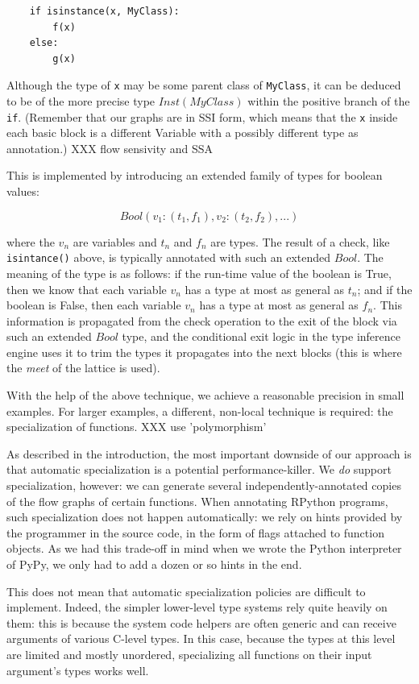 \documentclass{acm_proc_article-sp}
\begin{document}
\begin{verbatim}
    if isinstance(x, MyClass):
        f(x)
    else:
        g(x)
\end{verbatim}

Although the type of \texttt{x} may be some parent class of
\texttt{MyClass}, it can be deduced to be of the more precise type
$Inst(MyClass)$ within the positive branch of the \texttt{if}.
(Remember that our graphs are in SSI form, which means that the
\texttt{x} inside each basic block is a different Variable with a
possibly different type as annotation.) XXX flow sensivity and SSA

This is implemented by introducing an extended family of types for
boolean values:

$$
Bool(v_1: (t_1, f_1), v_2: (t_2, f_2), ...)
$$

where the $v_n$ are variables and $t_n$ and $f_n$ are types.  The
result of a check, like \texttt{isintance()} above, is typically
annotated with such an extended $Bool$.  The meaning of the type is as
follows: if the run-time value of the boolean is True, then we know
that each variable $v_n$ has a type at most as general as $t_n$; and
if the boolean is False, then each variable $v_n$ has a type at most
as general as $f_n$.  This information is propagated from the check
operation to the exit of the block via such an extended $Bool$ type,
and the conditional exit logic in the type inference engine uses it to
trim the types it propagates into the next blocks (this is where the
\textit{meet} of the lattice is used).

With the help of the above technique, we achieve a reasonable precision
in small examples.  For larger examples, a different, non-local
technique is required: the specialization of functions. XXX use 'polymorphism'

As described in the introduction, the most important downside of our
approach is that automatic specialization is a potential
performance-killer.  We \textit{do} support specialization, however: we can
generate several independently-annotated copies of the flow graphs of
certain functions.  When annotating RPython programs, such
specialization does not happen automatically: we rely on hints provided
by the programmer in the source code, in the form of flags attached to
function objects.  As we had this trade-off in mind when we wrote the
Python interpreter of PyPy, we only had to add a dozen or so hints in
the end.

This does not mean that automatic specialization policies are difficult
to implement.  Indeed, the simpler lower-level type systems rely quite
heavily on them: this is because the system code helpers are often
generic and can receive arguments of various C-level types.  In this
case, because the types at this level are limited and mostly unordered,
specializing all functions on their input argument's types works well.
\end{document}
